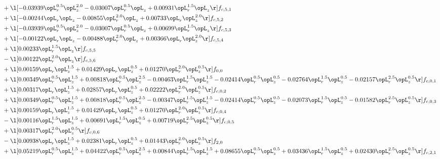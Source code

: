 \begin{alignat}{2}
& + \l[  -0.03939 \opL_r^{0.5} \opL_z^{2.0}   -0.03007 \opL_r^{0.5} \opL_z +  0.00931 \opL_r^{1.5} \opL_z  \r] f_{c,5,1} \nonumber \\ 
& + \l[  -0.00244 \opL_r \opL_z   -0.00855 \opL_r^{2.0} \opL_z +  0.00733 \opL_r \opL_z^{2.0}  \r] f_{c,5,2} \nonumber \\ 
& + \l[  -0.03939 \opL_r^{0.5} \opL_z^{2.0}   -0.03007 \opL_r^{0.5} \opL_z +  0.00699 \opL_r^{1.5} \opL_z  \r] f_{c,5,3} \nonumber \\ 
& + \l[  -0.00122 \opL_r \opL_z   -0.00488 \opL_r^{2.0} \opL_z +  0.00366 \opL_r \opL_z^{2.0}  \r] f_{c,5,4} \nonumber \\ 
& + \l[  0.00233 \opL_r^{1.5} \opL_z  \r] f_{c,5,5} \nonumber \\ 
& - \l[  0.00122 \opL_r^{2.0} \opL_z  \r] f_{c,5,6} \nonumber \\ 
& + \l[  0.00159 \opL_r \opL_z^{1.5} +  0.01429 \opL_r \opL_z^{0.5} +  0.01270 \opL_r^{2.0} \opL_z^{0.5}  \r] f_{0,0} \nonumber \\ 
& + \l[  0.00349 \opL_r^{0.5} \opL_z^{1.5} +  0.00818 \opL_r^{0.5} \opL_z^{2.5}   -0.00463 \opL_r^{1.5} \opL_z^{1.5}   -0.02414 \opL_r^{0.5} \opL_z^{0.5}   -0.02764 \opL_r^{1.5} \opL_z^{0.5}   -0.02157 \opL_r^{2.5} \opL_z^{0.5}  \r] f_{c,0,1} \nonumber \\ 
& + \l[  0.00317 \opL_r \opL_z^{1.5} +  0.02857 \opL_r \opL_z^{0.5} +  0.02222 \opL_r^{2.0} \opL_z^{0.5}  \r] f_{c,0,2} \nonumber \\ 
& + \l[  0.00349 \opL_r^{0.5} \opL_z^{1.5} +  0.00818 \opL_r^{0.5} \opL_z^{2.5}   -0.00347 \opL_r^{1.5} \opL_z^{1.5}   -0.02414 \opL_r^{0.5} \opL_z^{0.5}   -0.02073 \opL_r^{1.5} \opL_z^{0.5}   -0.01582 \opL_r^{2.5} \opL_z^{0.5}  \r] f_{c,0,3} \nonumber \\ 
& + \l[  0.00159 \opL_r \opL_z^{1.5} +  0.01429 \opL_r \opL_z^{0.5} +  0.01270 \opL_r^{2.0} \opL_z^{0.5}  \r] f_{c,0,4} \nonumber \\ 
& - \l[  0.00116 \opL_r^{1.5} \opL_z^{1.5} +  0.00691 \opL_r^{1.5} \opL_z^{0.5} +  0.00719 \opL_r^{2.5} \opL_z^{0.5}  \r] f_{c,0,5} \nonumber \\ 
& + \l[  0.00317 \opL_r^{2.0} \opL_z^{0.5}  \r] f_{c,0,6} \nonumber \\ 
& - \l[  0.00938 \opL_r \opL_z^{1.5} +  0.02381 \opL_r \opL_z^{0.5} +  0.01443 \opL_r^{2.0} \opL_z^{0.5}  \r] f_{2,0} \nonumber \\ 
& + \l[  0.05219 \opL_r^{0.5} \opL_z^{1.5} +  0.04422 \opL_r^{0.5} \opL_z^{2.5} +  0.00844 \opL_r^{1.5} \opL_z^{1.5} +  0.08655 \opL_r^{0.5} \opL_z^{0.5} +  0.03436 \opL_r^{1.5} \opL_z^{0.5} +  0.02430 \opL_r^{2.5} \opL_z^{0.5}  \r] f_{c,2,1} \nonumber \\ 

\end{alignat}
